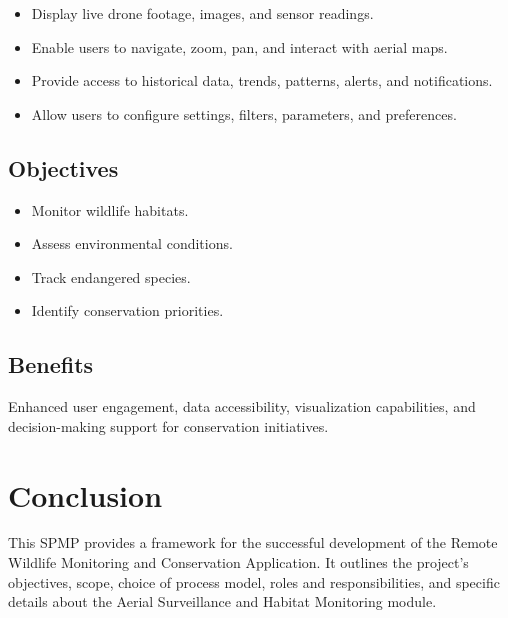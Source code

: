 \documentclass{article}
\begin{document}
\begin{itemize}
    \item Display live drone footage, images, and sensor readings.
    \item Enable users to navigate, zoom, pan, and interact with aerial maps.
    \item Provide access to historical data, trends, patterns, alerts, and notifications.
    \item Allow users to configure settings, filters, parameters, and preferences.
\end{itemize}

\subsection{Objectives}

\begin{itemize}
    \item Monitor wildlife habitats.
    \item Assess environmental conditions.
    \item Track endangered species.
    \item Identify conservation priorities.
\end{itemize}

\subsection{Benefits}

Enhanced user engagement, data accessibility, visualization capabilities, and decision-making support for conservation initiatives.

\section{Conclusion}

This SPMP provides a framework for the successful development of the Remote Wildlife Monitoring and Conservation Application. It outlines the project's objectives, scope, choice of process model, roles and responsibilities, and specific details about the Aerial Surveillance and Habitat Monitoring module.
\end{document}
